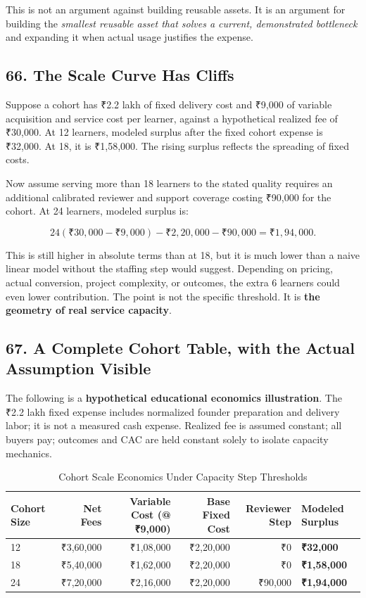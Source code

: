 This is not an argument against building reusable assets. It is an argument for building the \emph{smallest reusable asset that solves a current, demonstrated bottleneck} and expanding it when actual usage justifies the expense.

\subsection*{66. The Scale Curve Has Cliffs}

Suppose a cohort has ₹2.2 lakh of fixed delivery cost and ₹9,000 of variable acquisition and service cost per learner, against a hypothetical realized fee of ₹30,000. At 12 learners, modeled surplus after the fixed cohort expense is ₹32,000. At 18, it is ₹1,58,000. The rising surplus reflects the spreading of fixed costs.

Now assume serving more than 18 learners to the stated quality requires an additional calibrated reviewer and support coverage costing ₹90,000 for the cohort. At 24 learners, modeled surplus is:

\begin{equation}
24(₹30{,}000 - ₹9{,}000) - ₹2{,}20{,}000 - ₹90{,}000 = \text{₹}1{,}94{,}000.
\end{equation}

This is still higher in absolute terms than at 18, but it is much lower than a naive linear model without the staffing step would suggest. Depending on pricing, actual conversion, project complexity, or outcomes, the extra 6 learners could even lower contribution. The point is not the specific threshold. It is \textbf{the geometry of real service capacity}.

\subsection*{67. A Complete Cohort Table, with the Actual Assumption Visible}

The following is a \textbf{hypothetical educational economics illustration}. The ₹2.2 lakh fixed expense includes normalized founder preparation and delivery labor; it is not a measured cash expense. Realized fee is assumed constant; all buyers pay; outcomes and CAC are held constant solely to isolate capacity mechanics.

\begin{table}[t]
\centering
\small
\caption{Cohort Scale Economics Under Capacity Step Thresholds}
\begin{tabularx}{\textwidth}{p{}rrrrX}
\toprule
\textbf{Cohort Size} & \textbf{Net Fees} & \textbf{Variable Cost (@ ₹9,000)} & \textbf{Base Fixed Cost} & \textbf{Reviewer Step} & \textbf{Modeled Surplus} \\
\midrule
12 & ₹3,60,000 & ₹1,08,000 & ₹2,20,000 & ₹0 & \textbf{₹32,000} \\
18 & ₹5,40,000 & ₹1,62,000 & ₹2,20,000 & ₹0 & \textbf{₹1,58,000} \\
24 & ₹7,20,000 & ₹2,16,000 & ₹2,20,000 & ₹90,000 & \textbf{₹1,94,000} \\
\bottomrule
\end{tabularx}
\end{table}

